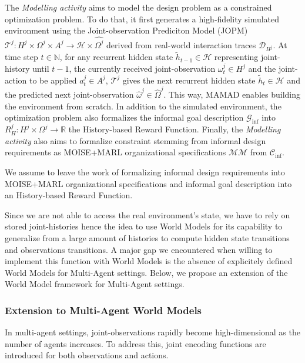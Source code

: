 \noindent The \textit{Modelling activity} aims to model the design problem as a constrained optimization problem. To do that, it first generates a high-fidelity simulated environment using the Joint-observation Prediciton Model (JOPM) $\mathcal{T}^j: H^j \times \Omega^j \times A^j \rightarrow \mathcal{H} \times \hat{\Omega^j}$ derived from real-world interaction traces $\mathcal{D}_{H^j}$. At time step $t \in \mathbb{N}$, for any recurrent hidden state $\tilde{h}_{t-1} \in \mathcal{H}$ representing joint-history until $t-1$, the currently received joint-observation $\omega_t^j \in H^j$ and the joint-action to be applied $a_t^j \in A^j$, $\mathcal{T}^j$ gives the next recurrent hidden state $\tilde{h}_t \in \mathcal{H}$ and the predicted next joint-observation $\hat{\omega}^j \in \hat{\Omega}^j$. This way, MAMAD enables building the environment from scratch. In addition to the simulated environment, the optimization problem also formalizes the informal goal description $\mathcal{G}_{\text{inf}}$ into $R^j_H: H^j \times \Omega^j \rightarrow \mathbb{R}$ the History-based Reward Function. Finally, the \textit{Modelling activity} also aims to formalize constraint stemming from informal design requirements as MOISE+MARL organizational specifications $\mathcal{MM}$ from $\mathcal{C}_{\text{inf}}$.

We assume to leave the work of formalizing informal design requirements into MOISE+MARL organizational specifications and informal goal description into an History-based Reward Function.

Since we are not able to access the real environment's state, we have to rely on stored joint-histories hence the idea to use World Models for its capability to generalize from a large amount of histories to compute hidden state transitions and observations transitions.
A major gap we encountered when willing to implement this function with World Models is the absence of explicitely defined World Models for Multi-Agent settings. Below, we propose an extension of the World Model framework for Multi-Agent settings.

\subsubsection*{Extension to Multi-Agent World Models}

In multi-agent settings, joint-observations rapidly become high-dimensional as the number of agents increases. To address this, joint encoding functions are introduced for both observations and actions.

